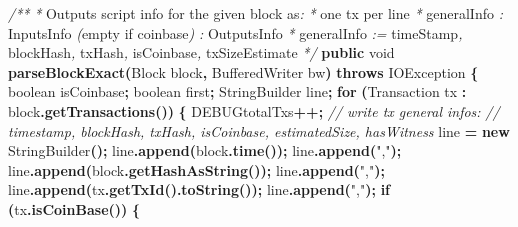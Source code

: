\documentclass[
  italian,
  openany]{book}
\newenvironment{Shaded}{\begin{snugshade}}{\end{snugshade}}
\newcommand{\BuiltInTok}[1]{#1}
\newcommand{\CommentTok}[1]{\textcolor[rgb]{0.56,0.35,0.01}{\textit{#1}}}
\newcommand{\ControlFlowTok}[1]{\textcolor[rgb]{0.13,0.29,0.53}{\textbf{#1}}}
\newcommand{\DataTypeTok}[1]{\textcolor[rgb]{0.13,0.29,0.53}{#1}}
\newcommand{\FunctionTok}[1]{\textcolor[rgb]{0.13,0.29,0.53}{\textbf{#1}}}
\newcommand{\KeywordTok}[1]{\textcolor[rgb]{0.13,0.29,0.53}{\textbf{#1}}}
\newcommand{\NormalTok}[1]{#1}
\newcommand{\OperatorTok}[1]{\textcolor[rgb]{0.81,0.36,0.00}{\textbf{#1}}}
\newcommand{\StringTok}[1]{\textcolor[rgb]{0.31,0.60,0.02}{#1}}
\begin{document}
\begin{Shaded}
\begin{Highlighting}[]
\CommentTok{/**}
 \CommentTok{*}\NormalTok{ Outputs script info for the given block as}\CommentTok{:}
 \CommentTok{*}\NormalTok{ one tx per line}
 \CommentTok{*}\NormalTok{ generalInfo }\CommentTok{\textquotesingle{}:\textquotesingle{}}\NormalTok{ InputsInfo }\CommentTok{(}\NormalTok{empty if coinbase}\CommentTok{)} \CommentTok{\textquotesingle{}:\textquotesingle{}}\NormalTok{ OutputsInfo}
 \CommentTok{*}\NormalTok{ generalInfo }\CommentTok{:=}\NormalTok{ timeStamp}\CommentTok{\textquotesingle{},\textquotesingle{}}\NormalTok{ blockHash}\CommentTok{\textquotesingle{},\textquotesingle{}}\NormalTok{ txHash}\CommentTok{\textquotesingle{},\textquotesingle{}}\NormalTok{ isCoinbase}\CommentTok{\textquotesingle{},\textquotesingle{}}\NormalTok{ txSizeEstimate}
 \CommentTok{*/}
\KeywordTok{public} \DataTypeTok{void} \FunctionTok{parseBlockExact}\OperatorTok{(}\NormalTok{Block block}\OperatorTok{,} \BuiltInTok{BufferedWriter}\NormalTok{ bw}\OperatorTok{)} \KeywordTok{throws} \BuiltInTok{IOException} \OperatorTok{\{}
    \DataTypeTok{boolean}\NormalTok{ isCoinbase}\OperatorTok{;}
    \DataTypeTok{boolean}\NormalTok{ first}\OperatorTok{;}
    \BuiltInTok{StringBuilder}\NormalTok{ line}\OperatorTok{;}
    \ControlFlowTok{for} \OperatorTok{(}\NormalTok{Transaction tx }\OperatorTok{:}\NormalTok{ block}\OperatorTok{.}\FunctionTok{getTransactions}\OperatorTok{())} \OperatorTok{\{}
\NormalTok{        DEBUGtotalTxs}\OperatorTok{++;}
        \CommentTok{// write tx general infos:}
        \CommentTok{// timestamp, blockHash, txHash, isCoinbase, estimatedSize, hasWitness}
\NormalTok{        line }\OperatorTok{=} \KeywordTok{new} \BuiltInTok{StringBuilder}\OperatorTok{();}
\NormalTok{        line}\OperatorTok{.}\FunctionTok{append}\OperatorTok{(}\NormalTok{block}\OperatorTok{.}\FunctionTok{time}\OperatorTok{());}
\NormalTok{        line}\OperatorTok{.}\FunctionTok{append}\OperatorTok{(}\StringTok{","}\OperatorTok{);}
\NormalTok{        line}\OperatorTok{.}\FunctionTok{append}\OperatorTok{(}\NormalTok{block}\OperatorTok{.}\FunctionTok{getHashAsString}\OperatorTok{());}
\NormalTok{        line}\OperatorTok{.}\FunctionTok{append}\OperatorTok{(}\StringTok{","}\OperatorTok{);}
\NormalTok{        line}\OperatorTok{.}\FunctionTok{append}\OperatorTok{(}\NormalTok{tx}\OperatorTok{.}\FunctionTok{getTxId}\OperatorTok{().}\FunctionTok{toString}\OperatorTok{());}
\NormalTok{        line}\OperatorTok{.}\FunctionTok{append}\OperatorTok{(}\StringTok{","}\OperatorTok{);}
        \ControlFlowTok{if} \OperatorTok{(}\NormalTok{tx}\OperatorTok{.}\FunctionTok{isCoinBase}\OperatorTok{())} \OperatorTok{\{}

\end{Highlighting}
\end{Shaded}
\end{document}
